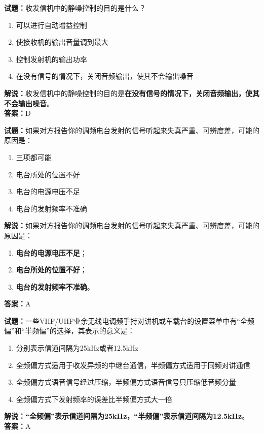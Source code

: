 \documentclass{ctexbook}
\begin{document}
\textbf{试题：}收发信机中的静噪控制的目的是什么？
\begin{enumerate}[leftmargin=3em]
  \item 可以进行自动增益控制
  \item 使接收机的输出音量调到最大
  \item 控制发射机的输出功率
  \item 在没有信号的情况下，关闭音频输出，使其不会输出噪音%
\end{enumerate}
\noindent\textbf{解说：}收发信机中的静噪控制的目的是\textbf{在没有信号的情况下，关闭音频输出，使其不会输出噪音}。\\\noindent\textbf{答案：}D

\vspace{1em}

\textbf{试题：}如果对方报告你的调频电台发射的信号听起来失真严重、可辨度差，可能的原因是：
\begin{enumerate}[leftmargin=3em]
  \item 三项都可能
  \item 电台所处的位置不好
  \item 电台的电源电压不足
  \item 电台的发射频率不准确
\end{enumerate}
\noindent\textbf{解说：}如果对方报告你的调频电台发射的信号听起来失真严重、可辨度差，可能的原因是：
\begin{enumerate}[label=, leftmargin=3em]
  \item \textbf{电台的电源电压不足}；
  \item \textbf{电台所处的位置不好}；
  \item \textbf{电台的发射频率不准确}。
\end{enumerate}
\noindent\textbf{答案：}A

\vspace{1em}

\textbf{试题：}一些VHF/UHF业余无线电调频手持对讲机或车载台的设置菜单中有“全频偏”和“半频偏”的选择，其表示的意义是：
\begin{enumerate}[leftmargin=3em]
  \item 分别表示信道间隔为25\unit{\kHz}或者12.5\unit{\kHz}
  \item 全频偏方式适用于收发异频的中继台通信，半频偏方式适用于同频对讲通信
  \item 全频偏方式语音信号经过压缩，半频偏方式语音信号只压缩低音频分量
  \item 全频偏方式下发射频率的误差比半频偏方式大一倍
\end{enumerate}
\noindent\textbf{解说：}\textbf{“全频偏”表示信道间隔为25\unit{\kHz}，“半频偏”表示信道间隔为12.5\unit{\kHz}}。\\\noindent\textbf{答案：}A
\end{document}

